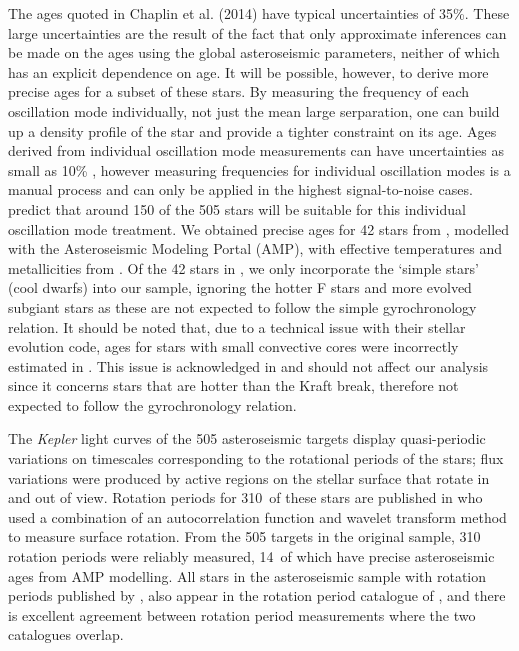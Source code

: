 \documentclass[11pt,preprint]{aastex}
\newcommand{\nastero}{310}
\newcommand{\nprecise}{14~}
\newcommand{\ngarcia}{310~}
\begin{document}
The ages quoted in Chaplin et al. (2014) have typical uncertainties of 35\%.
These large uncertainties are the result of the fact that only approximate inferences can be made on the ages using the global asteroseismic parameters, neither of which has an explicit dependence on age.
It will be possible, however, to derive more precise ages for a subset of these stars.
By measuring the frequency of each oscillation mode individually, not just the mean large serparation, one can build up a density profile of the star and provide a tighter constraint on its age.
Ages derived from individual oscillation mode measurements can have uncertainties as small as 10\% \citep{Brown1994, SilvaAguirre2013}, however measuring frequencies for individual oscillation modes is a manual process and can only be applied in the highest signal-to-noise cases.
\citet{Chaplin2014} predict that around 150 of the 505 stars will be suitable for this individual oscillation mode treatment.
We obtained precise ages for 42 stars from \citet{Metcalfe2014}, modelled with the Asteroseismic Modeling Portal (AMP), with effective temperatures and metallicities from \citet{Bruntt2012}.
Of the 42 stars in \citet{Metcalfe2014}, we only incorporate the `simple stars' (cool dwarfs) into our sample, ignoring the hotter F stars and more evolved subgiant stars as these are not expected to follow the simple gyrochronology relation.
It should be noted that, due to a technical issue with their stellar evolution code, ages for stars with small convective cores were incorrectly estimated in \citet{Chaplin2014}.
This issue is acknowledged in \citet{Metcalfe2014} and should not affect our analysis since it concerns stars that are hotter than the Kraft break, therefore not expected to follow the gyrochronology relation.

The {\it Kepler} light curves of the 505 asteroseismic targets display quasi-periodic variations on timescales corresponding to the rotational periods of the stars;
flux variations were produced by active regions on the stellar surface that rotate in and out of view.
Rotation periods for \ngarcia of these stars are published in \citet{Garcia2014} who used a combination of an autocorrelation function and wavelet transform method to measure surface rotation.
From the 505 targets in the original sample, \nastero$~$rotation periods were reliably measured, \nprecise of which have precise asteroseismic ages from AMP modelling.
All stars in the asteroseismic sample with rotation periods published by \citet{McQuillan_2014}, also appear in the rotation period catalogue of \citet{Garcia2014}, and there is excellent agreement between rotation period measurements where the two catalogues overlap.
\end{document}
